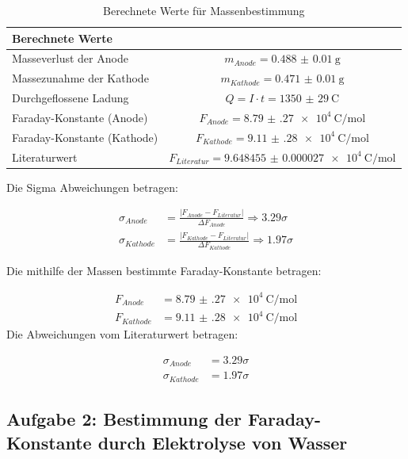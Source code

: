 \documentclass[12pt,a4paper,titlepage]{scrartcl}
\numberwithin{equation}{section}
\numberwithin{table}{section}
\numberwithin{figure}{section}
\begin{document}
\begin{table}[H]
    \centering
    \caption{Berechnete Werte für Massenbestimmung}
    \begin{tabular}{lc}
        \toprule
        \textbf{Berechnete Werte}\\
        \midrule
        Masseverlust der Anode & $m_{Anode} = \qty{0.488(10)}{\gram}$ \\
        Massezunahme der Kathode & $m_{Kathode} = \qty{0.471(10)}{\gram}$ \\
        Durchgeflossene Ladung & $Q = I \cdot t = \qty{1350(29)}{\coulomb}$ \\
        Faraday-Konstante (Anode) & $F_{Anode} = \qty{8.79(27)e4}{\coulomb\per\mol}$ \\
        Faraday-Konstante (Kathode) & $F_{Kathode} = \qty{9.11(28)e4}{\coulomb\per\mol}$ \\
        Literaturwert & $F_{Literatur} = \qty{9.648455(27)e4}{\coulomb\per\mol}$ \\
        \bottomrule
    \end{tabular}
\end{table}
Die Sigma Abweichungen betragen:

\begin{align}
    \sigma_{Anode} &= \frac{|F_{Anode} - F_{Literatur}|}{\Delta F_{Anode}} \Rightarrow 3.29\sigma\\
    \sigma_{Kathode} &= \frac{|F_{Kathode} - F_{Literatur}|}{\Delta F_{Kathode}} \Rightarrow 1.97\sigma
\end{align}


\begin{resultbox}[Ergebnis]
    Die mithilfe der Massen bestimmte Faraday-Konstante betragen:
    
\begin{align}
        F_{Anode} &= \qty{8.79(27)e4}{\coulomb\per\mol} \\
        F_{Kathode} &= \qty{9.11(28)e4}{\coulomb\per\mol}
    \end{align}
    Die Abweichungen vom Literaturwert betragen:
    
\begin{align}
        \sigma_{Anode} &= 3.29\sigma \\
        \sigma_{Kathode} &= 1.97\sigma
    \end{align}
\end{resultbox}

\bigskip
\subsection{Aufgabe 2: Bestimmung der Faraday-Konstante durch Elektrolyse von Wasser}
\end{document}

